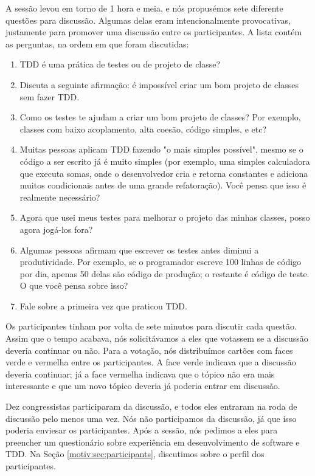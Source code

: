 A sessão levou em torno de 1 hora e meia, e nós propusémos sete diferente
questões para discussão. Algumas delas eram intencionalmente provocativas,
justamente para promover uma discussão entre os participantes. A lista
contém as perguntas, na ordem em que foram discutidas:

\begin{enumerate}
\item TDD é uma prática de testes ou de projeto de classe?
\item Discuta a seguinte afirmação: é impossível criar um bom projeto de classes sem fazer TDD.
\item Como os testes te ajudam a criar um bom projeto de classes? Por exemplo, classes com baixo
acoplamento, alta coesão, código simples, e etc?
\item Muitas pessoas aplicam TDD fazendo "o mais simples possível", mesmo se
o código a ser escrito já é muito simples (por exemplo, uma simples calculadora
que executa somas, onde o desenvolvedor cria e retorna constantes e adiciona
muitos condicionais antes de uma grande refatoração). Você pensa que isso
é realmente necessário?
\item Agora que usei meus testes para melhorar o projeto das minhas classes, posso
agora jogá-los fora?
\item Algumas pessoas afirmam que escrever os testes antes diminui a produtividade.
Por exemplo, se o programador escreve 100 linhas de código por dia, apenas 50 delas são
código de produção; o restante é código de teste. O que você pensa sobre isso?
\item Fale sobre a primeira vez que praticou TDD.
\label{questions}
\end{enumerate}

Os participantes tinham por volta de sete minutos para discutir cada questão.
Assim que o tempo acabava, nós solicitávamos a eles que votassem se a discussão
deveria continuar ou não. Para a votação, nós distribuímos cartões com faces
verde e vermelha entre os participantes. A face verde indicava que a discussão
deveria continuar; já a face vermelha indicava que o tópico não era mais 
interessante e que um novo tópico deveria já poderia entrar em discussão.

Dez congressistas participaram da discussão, e todos eles entraram na
roda de discussão pelo menos uma vez. Nós não participamos da discussão, já
que isso poderia enviesar os participantes. Após a sessão, nós pedimos a eles
para preencher um questionário sobre experiência em desenvolvimento de software
e TDD. Na Seção \ref{motiv:sec:participants}, discutimos sobre o 
perfil dos participantes.

